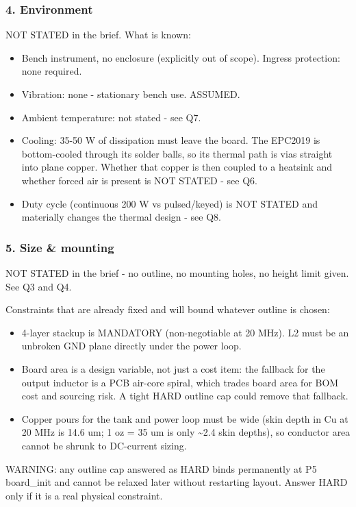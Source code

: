 \documentclass[11pt,a4paper]{article}
\begin{document}
\subsubsection*{4. Environment}
NOT STATED in the brief. What is known:

\begin{itemize}
\item Bench instrument, no enclosure (explicitly out of scope). Ingress protection: none required.
\item Vibration: none - stationary bench use. ASSUMED.
\item Ambient temperature: not stated - see Q7.
\item Cooling: 35-50 W of dissipation must leave the board. The EPC2019 is bottom-cooled through its
solder balls, so its thermal path is vias straight into plane copper. Whether that copper is
then coupled to a heatsink and whether forced air is present is NOT STATED - see Q6.
\item Duty cycle (continuous 200 W vs pulsed/keyed) is NOT STATED and materially changes the thermal
design - see Q8.
\end{itemize}
\subsubsection*{5. Size \& mounting}
NOT STATED in the brief - no outline, no mounting holes, no height limit given. See Q3 and Q4.

Constraints that are already fixed and will bound whatever outline is chosen:

\begin{itemize}
\item 4-layer stackup is MANDATORY (non-negotiable at 20 MHz). L2 must be an unbroken GND plane
directly under the power loop.
\item Board area is a design variable, not just a cost item: the fallback for the output inductor is a
PCB air-core spiral, which trades board area for BOM cost and sourcing risk. A tight HARD outline
cap could remove that fallback.
\item Copper pours for the tank and power loop must be wide (skin depth in Cu at 20 MHz is 14.6 um;
1 oz = 35 um is only \textasciitilde{}2.4 skin depths), so conductor area cannot be shrunk to DC-current sizing.
\end{itemize}
WARNING: any outline cap answered as HARD binds permanently at P5 board\_init and cannot be relaxed later without restarting layout. Answer HARD only if it is a real physical constraint.
\end{document}
